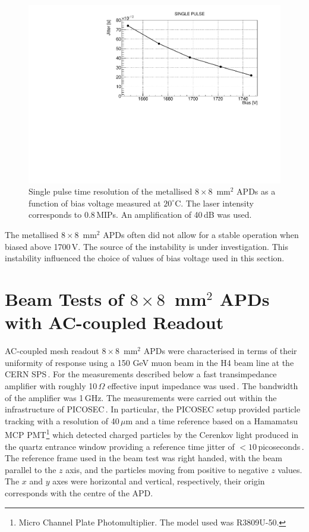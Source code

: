 \documentclass[review,number,sort&compress]{elsarticle}
\begin{document}
\begin{figure}
  \centering
  \includegraphics[width = 0.6 \columnwidth]{timeRes8x8metal}
  \caption{Single pulse time resolution of the metallised $8 \times 8$~mm$^2$ APDs as a function of bias voltage measured at $20^\circ$C. The laser intensity corresponds to 0.8\,MIPs. An amplification of 40\,dB was used.}
  \label{fig:timeRes8x8metal}
\end{figure}

The metallised $8 \times 8$~mm$^2$ APDs often did not allow for a stable operation when biased above 1700\,V.
The source of the instability is under investigation.
This instability influenced the choice of values of bias voltage used in this section.

\section{Beam Tests of $8 \times 8$~mm$^2$ APDs with AC-coupled Readout}
\label{sec:tb8x8}

AC-coupled mesh readout $8 \times 8$~mm$^2$ APDs were characterised in terms of their uniformity of response using a 150 GeV muon beam in the H4 beam line at the CERN SPS\,\cite{h4page}.
For the measurements described below a fast transimpedance amplifier with roughly 10\,$\Omega$ effective input impedance was used\,\cite{whiteACES2014}.
The bandwidth of the amplifier was 1\,GHz.
The measurements were carried out within the infrastructure of PICOSEC\,\cite{bortfeld2018}.
In particular, the PICOSEC setup provided particle tracking with a resolution of 40\,$\mu$m and a time reference based on a Hamamatsu MCP PMT\footnote{Micro Channel Plate Photomultiplier. The model used was R3809U-50.} which detected charged particles by the Cerenkov light produced in the quartz entrance window providing a reference time jitter of $<10$\,picoseconds\,\cite{sohl2018}.
The reference frame used in the beam test was right handed, with the beam parallel to the $z$ axis, and the particles moving from positive to negative $z$ values.
The $x$ and $y$ axes were horizontal and vertical, respectively, their origin corresponds with the centre of the APD.
\end{document}
